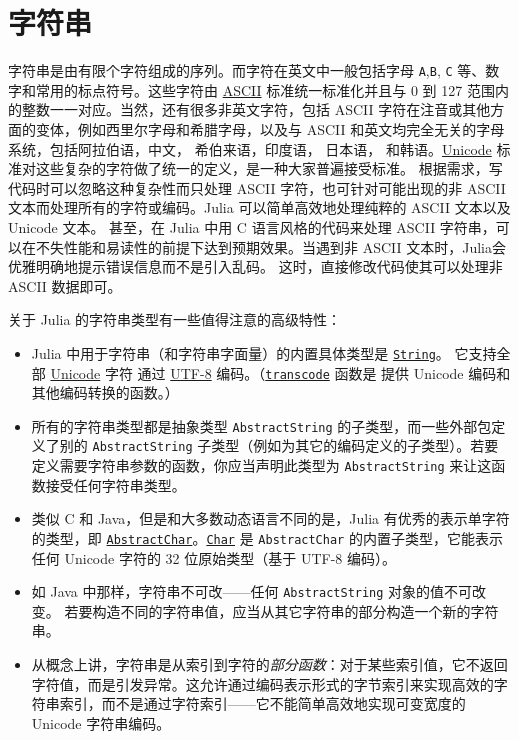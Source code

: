 \chapter{字符串}



字符串是由有限个字符组成的序列。而字符在英文中一般包括字母 \texttt{A},\texttt{B}, \texttt{C} 等、数字和常用的标点符号。这些字符由 \href{https://en.wikipedia.org/wiki/ASCII}{ASCII} 标准统一标准化并且与 0 到 127 范围内的整数一一对应。当然，还有很多非英文字符，包括 ASCII 字符在注音或其他方面的变体，例如西里尔字母和希腊字母，以及与 ASCII 和英文均完全无关的字母系统，包括阿拉伯语，中文， 希伯来语，印度语， 日本语， 和韩语。\href{https://en.wikipedia.org/wiki/Unicode}{Unicode} 标准对这些复杂的字符做了统一的定义，是一种大家普遍接受标准。 根据需求，写代码时可以忽略这种复杂性而只处理 ASCII 字符，也可针对可能出现的非 ASCII 文本而处理所有的字符或编码。Julia 可以简单高效地处理纯粹的 ASCII 文本以及 Unicode 文本。 甚至，在 Julia 中用 C 语言风格的代码来处理 ASCII 字符串，可以在不失性能和易读性的前提下达到预期效果。当遇到非 ASCII 文本时，Julia会优雅明确地提示错误信息而不是引入乱码。 这时，直接修改代码使其可以处理非 ASCII 数据即可。



关于 Julia 的字符串类型有一些值得注意的高级特性：



\begin{itemize}
\item Julia 中用于字符串（和字符串字面量）的内置具体类型是 \hyperlink{2825695355940841177}{\texttt{String}}。 它支持全部 \href{https://en.wikipedia.org/wiki/Unicode}{Unicode} 字符 通过 \href{https://en.wikipedia.org/wiki/UTF-8}{UTF-8} 编码。（\hyperlink{11147209877072452260}{\texttt{transcode}} 函数是 提供 Unicode 编码和其他编码转换的函数。）


\item 所有的字符串类型都是抽象类型 \texttt{AbstractString} 的子类型，而一些外部包定义了别的 \texttt{AbstractString} 子类型（例如为其它的编码定义的子类型）。若要定义需要字符串参数的函数，你应当声明此类型为 \texttt{AbstractString} 来让这函数接受任何字符串类型。


\item 类似 C 和 Java，但是和大多数动态语言不同的是，Julia 有优秀的表示单字符的类型，即 \hyperlink{17842511721012314372}{\texttt{AbstractChar}}。\hyperlink{3463806064296245385}{\texttt{Char}} 是 \texttt{AbstractChar} 的内置子类型，它能表示任何 Unicode 字符的 32 位原始类型（基于 UTF-8 编码）。


\item 如 Java 中那样，字符串不可改——任何 \texttt{AbstractString} 对象的值不可改变。 若要构造不同的字符串值，应当从其它字符串的部分构造一个新的字符串。


\item 从概念上讲，字符串是从索引到字符的\emph{部分函数}：对于某些索引值，它不返回字符值，而是引发异常。这允许通过编码表示形式的字节索引来实现高效的字符串索引，而不是通过字符索引——它不能简单高效地实现可变宽度的 Unicode 字符串编码。

\end{itemize}


